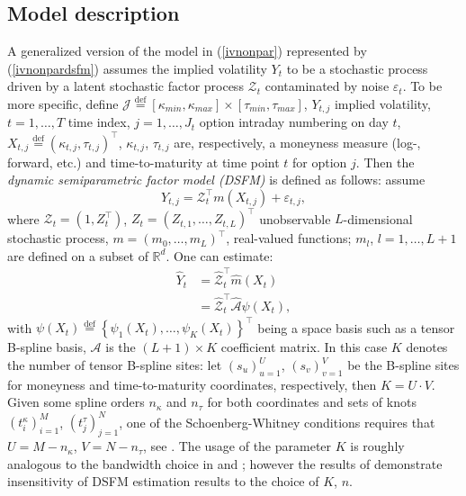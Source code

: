 \documentclass{rQUF2e}
\theoremstyle{plain}
\theoremstyle{definition}
\begin{document}
	\subsection{Model description}
	A generalized version of the model in (\ref{ivnonpar}) represented by (\ref{ivnonpardsfm}) assumes the implied volatility $Y_t$ to be a stochastic process driven by a latent stochastic factor process $\mathcal{Z}_t$ contaminated by noise $\varepsilon_t$. To be more specific, define $\mathcal{J} \stackrel{\operatorname{def}}{=} [{\kappa}_{min},{\kappa}_{max}] \times [{\tau}_{min},{\tau}_{max}]$, $Y_{t,j}$ implied volatility, $t = 1,\ldots,T$ time index, $j = 1,\ldots,J_t$ option intraday numbering on day $t$, $X_{t,j} \stackrel{\operatorname{def}}{=} ({\kappa}_{t,j}, \tau_{t,j})^{\top}$, ${\kappa}_{t,j}$, ${\tau}_{t,j}$ are, respectively, a moneyness measure (log-, forward, etc.) and time-to-maturity at time point $t$ for option $j$. Then the \textit{dynamic semiparametric factor model (DSFM)} is defined as follows: assume
	\begin{equation}
	Y_{t,j} = \mathcal{Z}^{\top}_t m(X_{t,j}) + \varepsilon_{t,j},
	\label{dsfm}
	\end{equation}
	where $\mathcal{Z}_t = (1,Z_t^{\top})$, $Z_t = (Z_{t,1},\ldots,Z_{t,L})^{\top}$ unobservable $L$-dimensional stochastic process, $m = (m_0,\ldots,m_L)^{\top}$, real-valued functions; $m_l$, $l = 1,\ldots,L+1$ are defined on a subset of $\mathbb{R}^d$. One can estimate:
	\begin{align}
	\widehat{Y}_t &= \widehat{\mathcal{Z}}^{\top}_t \widehat{m}(X_t)\\
	&= \widehat{\mathcal{Z}}^{\top}_t \widehat{\mathcal{A}} \psi(X_{t}),
	\end{align}
	with $\psi (X_t) \stackrel{\operatorname{def}}{=} \left\{\psi_1(X_t),\ldots,\psi_K(X_t)\right\}^{\top}$ being a space basis such as a tensor B-spline basis, $\mathcal{A}$ is the $(L+1) \times K$ coefficient matrix. In this case $K$ denotes the number of tensor B-spline sites: let $(s_u)_{u=1}^{U}$, $(s_v)_{v=1}^{V}$ be the B-spline sites for moneyness and time-to-maturity coordinates, respectively, then $K = U \cdot V$. Given some spline orders $n_{\kappa}$ and $n_{\tau}$ for both coordinates and sets of knots $(t^{\kappa}_i)_{i=1}^{M}$, $(t^{\tau}_j)_{j=1}^{N}$, one of the Schoenberg-Whitney conditions requires that $U = M - n_{\kappa}$, $V = N - n_{\tau}$, see \citet{de_boor}. The usage of the parameter $K$ is roughly analogous to the bandwidth choice in \citet{fengler_haerdle_villa} and \citet{fengler_haerdle_mammen}; however the results of \citet{park_et_al} demonstrate insensitivity of DSFM estimation results to the choice of $K$, $n$.   
	
\end{document}
